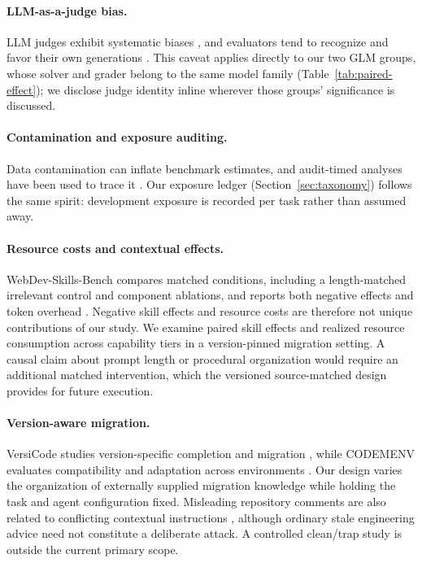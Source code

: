 \documentclass[11pt]{article}
\begin{document}
\paragraph{LLM-as-a-judge bias.}
LLM judges exhibit systematic biases \citep{mt-bench-judge}, and evaluators tend to recognize and favor their own generations \citep{self-preference}.
This caveat applies directly to our two GLM groups, whose solver and grader belong to the same model family (Table~\ref{tab:paired-effect}); we disclose judge identity inline wherever those groups' significance is discussed.

\paragraph{Contamination and exposure auditing.}
Data contamination can inflate benchmark estimates, and audit-timed analyses have been used to trace it \citep{time-travel-contamination}.
Our exposure ledger (Section~\ref{sec:taxonomy}) follows the same spirit: development exposure is recorded per task rather than assumed away.

\paragraph{Resource costs and contextual effects.}
WebDev-Skills-Bench compares matched conditions, including a length-matched irrelevant control and component ablations, and reports both negative effects and token overhead \citep{webdev-skills-bench}.
Negative skill effects and resource costs are therefore not unique contributions of our study.
We examine paired skill effects and realized resource consumption across capability tiers in a version-pinned migration setting.
A causal claim about prompt length or procedural organization would require an additional matched intervention, which the versioned source-matched design provides for future execution.

\paragraph{Version-aware migration.}
VersiCode studies version-specific completion and migration \citep{versicode}, while CODEMENV evaluates compatibility and adaptation across environments \citep{codemenv}.
Our design varies the organization of externally supplied migration knowledge while holding the task and agent configuration fixed.
Misleading repository comments are also related to conflicting contextual instructions \citep{indirect-prompt-injection}, although ordinary stale engineering advice need not constitute a deliberate attack.
A controlled clean/trap study is outside the current primary scope.
\end{document}
